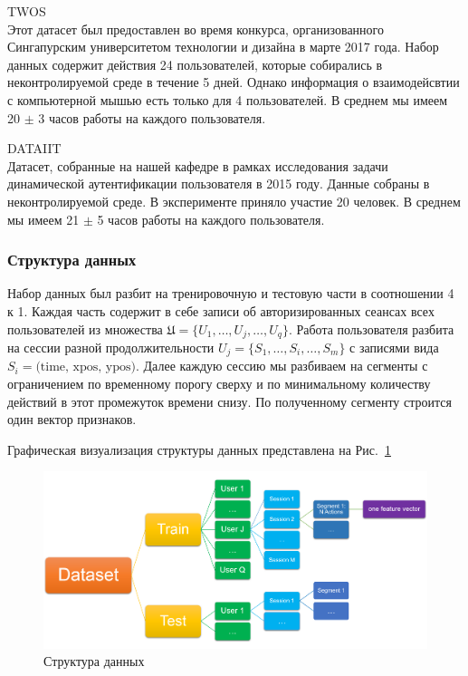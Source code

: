 \documentclass[12pt]{article}
\begin{document}
    \par \textsc{TWOS} \cite{TWOS} \\
    \noindent Этот датасет был предоставлен во время конкурса, организованного Сингапурским университетом технологии и дизайна в марте 2017 года. Набор данных содержит действия 24 пользователей, которые собирались в неконтролируемой среде в течение 5 дней. Однако информация о взаимодейсвтии с компьютерной мышью есть только для 4 пользователей. В среднем мы имеем 20 $\pm$ 3 часов работы на каждого пользователя. \\

    \par \textsc{DATAIIT} \\
    \noindent Датасет, собранные на нашей кафедре в рамках исследования задачи динамической аутентификации пользователя в 2015 году. Данные собраны в неконтролируемой среде. В эксперименте приняло участие 20 человек. В среднем мы имеем 21 $\pm$ 5 часов работы на каждого пользователя. \\


    \subsubsection{Структура данных}
    \label{sec:Research:Data:Struct}
    
    \par Набор данных был разбит на тренировочную и тестовую части в соотношении 4 к 1. Каждая часть содержит в себе записи об авторизированных сеансах всех пользователей из множества $\mathfrak{U}=\{U_1, \ldots, U_j, \ldots, U_q\}$. Работа пользователя разбита на сессии разной продолжительности $U_j = \{S_1, \ldots, S_i, \ldots, S_m\}$ с записями вида $S_i = \text{(time, xpos, ypos)}$. Далее каждую сессию мы разбиваем на сегменты с ограничением по временному порогу сверху и по минимальному количеству действий в этот промежуток времени снизу. По полученному сегменту строится один вектор признаков. \\
    \par Графическая визуализация структуры данных представлена на Рис.~\ref{sec:Research:Data:Description:fig:DataStructure}

    \begin{figure}[h]
        \centering
        \includegraphics[width=\linewidth]{DataStructure.png}
        \caption{Структура данных}
        \label{sec:Research:Data:Description:fig:DataStructure}
    \end{figure}
\end{document}
